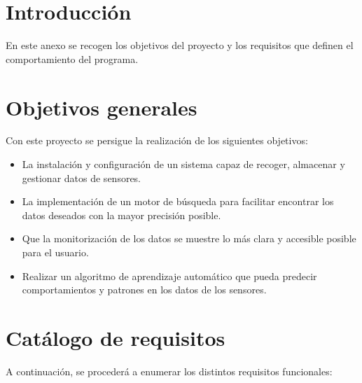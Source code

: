 
\section{Introducción}

En este anexo se recogen los objetivos del proyecto y los requisitos que definen el comportamiento del programa.

\section{Objetivos generales}

Con este proyecto se persigue la realización de los siguientes objetivos:

\begin{itemize}
    \item La instalación y configuración de un sistema capaz de recoger, almacenar y gestionar datos de sensores.
    \item La implementación de un motor de búsqueda para facilitar encontrar los datos deseados con la mayor precisión posible.
    \item Que la monitorización de los datos se muestre lo más clara y accesible posible para el usuario.
    \item Realizar un algoritmo de aprendizaje automático que pueda predecir comportamientos y patrones en los datos de los sensores.
\end{itemize}

\newpage
\section{Catálogo de requisitos}
A continuación, se procederá a enumerar los distintos requisitos funcionales:



